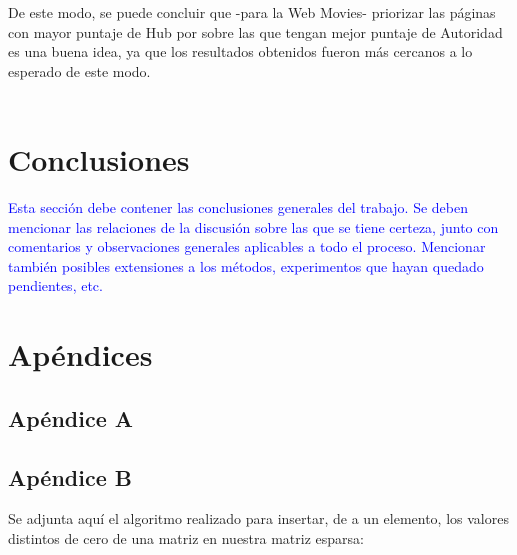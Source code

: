 \documentclass[a4paper]{article}
\begin{document}
\indent De este modo, se puede concluir que -para la Web Movies- priorizar las p\'aginas con mayor puntaje de Hub por sobre las que tengan mejor puntaje de Autoridad es una buena idea, ya que los resultados obtenidos fueron m\'as cercanos a lo esperado de este modo.\\
\\
\newpage
\section{Conclusiones}
\textcolor{blue}{Esta secci\'on debe contener las conclusiones generales del trabajo. Se deben mencionar
las relaciones de la discusi\'on sobre las que se tiene certeza, junto con comentarios
y observaciones generales aplicables a todo el proceso. Mencionar tambi\'en posibles
extensiones a los m\'etodos, experimentos que hayan quedado pendientes, etc.
}
\\
\newpage
\section{Ap\'endices}
	\subsection{Ap\'endice A}
%		
\newpage
	\subsection{Ap\'endice B}
Se adjunta aqu\'i el algoritmo realizado para insertar, de a un elemento, los valores distintos de cero de una matriz en nuestra matriz esparsa: \\
\end{document}
